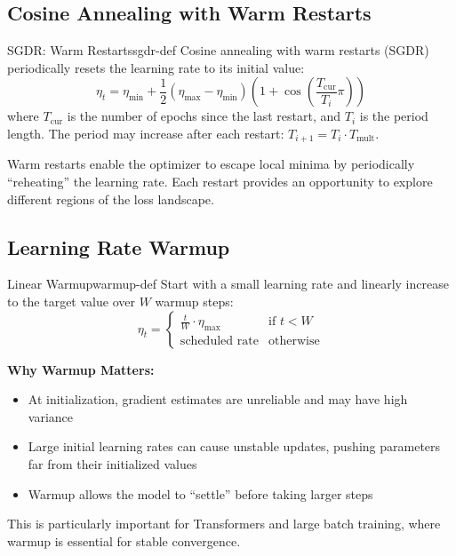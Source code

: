 \documentclass[../../main.tex]{subfiles}
\begin{document}
\subsection{Cosine Annealing with Warm Restarts}

\begin{definition}{SGDR: Warm Restarts}{sgdr-def}
Cosine annealing with warm restarts (SGDR) periodically resets the learning rate to its initial value:
\[
    \eta_t = \eta_{\min} + \frac{1}{2}(\eta_{\max} - \eta_{\min})\left(1 + \cos\left(\frac{T_{\text{cur}}}{T_i}\pi\right)\right)
\]
where $T_{\text{cur}}$ is the number of epochs since the last restart, and $T_i$ is the period length. The period may increase after each restart: $T_{i+1} = T_i \cdot T_{\text{mult}}$.
\end{definition}

Warm restarts enable the optimizer to escape local minima by periodically ``reheating'' the learning rate. Each restart provides an opportunity to explore different regions of the loss landscape.

\subsection{Learning Rate Warmup}

\begin{definition}{Linear Warmup}{warmup-def}
Start with a small learning rate and linearly increase to the target value over $W$ warmup steps:
\[
    \eta_t = \begin{cases}
        \frac{t}{W} \cdot \eta_{\max} & \text{if } t < W \\
        \text{scheduled rate} & \text{otherwise}
    \end{cases}
\]
\end{definition}

\begin{keyconcept}
\textbf{Why Warmup Matters:}
\begin{itemize}
    \item At initialization, gradient estimates are unreliable and may have high variance
    \item Large initial learning rates can cause unstable updates, pushing parameters far from their initialized values
    \item Warmup allows the model to ``settle'' before taking larger steps
\end{itemize}
This is particularly important for Transformers and large batch training, where warmup is essential for stable convergence.
\end{keyconcept}
\end{document}
